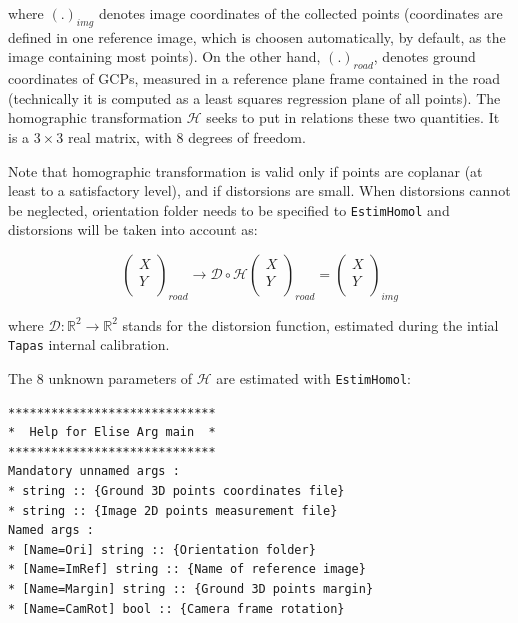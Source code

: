 \noindent where $(.)_{img}$ denotes image coordinates of the collected points (coordinates are defined in one reference image, which is choosen automatically, by default, as the image containing most points). On the other hand, $(.)_{road}$, denotes ground coordinates of GCPs, measured in a reference plane frame contained in the road (technically it is computed as a least squares regression plane of all points). The homographic transformation $\mathcal{H}$ seeks to put in relations these two quantities. It is a $3 \times 3$ real matrix, with 8 degrees of freedom. \newline

\noindent Note that homographic transformation is valid only if points are coplanar (at least to a satisfactory level), and if distorsions are small. When distorsions cannot be neglected, orientation folder needs to be specified to \texttt{EstimHomol} and distorsions will be taken into account as: \newline

$$\left(
\begin{array}{c}
X\\
Y\\
\end{array}
\right)_{road} \rightarrow \mathcal{D} \circ \mathcal{H}\left(\begin{array}{c}
X\\
Y\\
\end{array}\right)_{road} = \left(\begin{array}{c}
X\\
Y\\
\end{array}\right)_{img}$$ \newline

\noindent where $\mathcal{D} : \mathbb{R}^2 \rightarrow \mathbb{R}^2$ stands for the distorsion function, estimated during the intial \texttt{Tapas} internal calibration. \newline

\noindent The 8 unknown parameters of $\mathcal{H}$ are estimated with \texttt{EstimHomol}: \newline

\begin{verbatim}
*****************************
*  Help for Elise Arg main  *
*****************************
Mandatory unnamed args : 
* string :: {Ground 3D points coordinates file}
* string :: {Image 2D points measurement file}
Named args : 
* [Name=Ori] string :: {Orientation folder}
* [Name=ImRef] string :: {Name of reference image}
* [Name=Margin] string :: {Ground 3D points margin}
* [Name=CamRot] bool :: {Camera frame rotation}
\end{verbatim}

